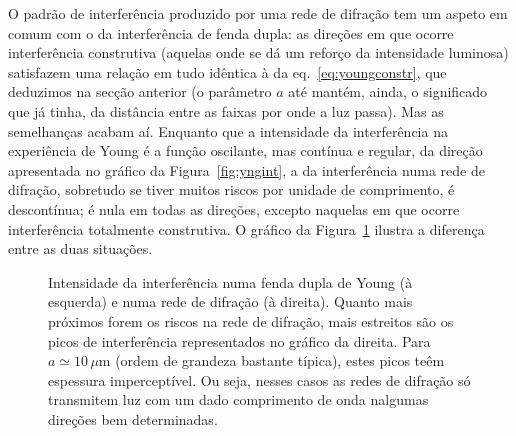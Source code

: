 O padrão de interferência produzido por uma rede de difração tem um aspeto em
comum com o da interferência de fenda dupla: as direções em que ocorre
interferência construtiva (aquelas onde se dá um reforço da intensidade
luminosa) satisfazem uma relação em tudo idêntica à da
eq.~\eqref{eq:youngconstr}, que deduzimos na secção anterior (o parâmetro $a$
até mantém, ainda, o significado que já tinha, da distância entre as faixas por
onde a luz passa). Mas as semelhanças acabam aí. Enquanto que a intensidade da
interferência na experiência de Young é a função oscilante, mas contínua e
regular, da direção apresentada no gráfico da Figura~\ref{fig:yngint}, a da
interferência numa rede de difração, sobretudo se tiver muitos riscos por
unidade de comprimento, é descontínua; é nula em todas as direções, excepto
naquelas em que ocorre interferência totalmente construtiva. O gráfico da
Figura~\ref{fig:gratingi} ilustra a diferença entre as duas situações.
\begin{figure}[htb]
{\centering
  \par
}
\caption{\label{fig:gratingi}Intensidade da interferência numa fenda dupla de
Young (à esquerda) e numa rede de difração (à direita). Quanto mais próximos
forem os riscos na rede de difração, mais estreitos são os picos de
interferência representados no gráfico da direita. Para $a\simeq 10\,\mu$m
(ordem de grandeza bastante típica), estes picos teêm espessura imperceptível.
Ou seja, nesses casos as redes de difração só transmitem luz com um dado
comprimento de onda nalgumas direções bem determinadas.}
\end{figure}


